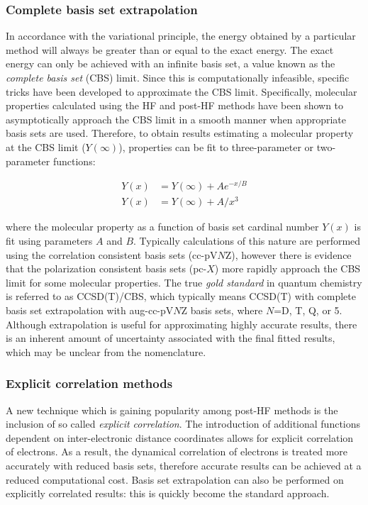 \subsubsection{Complete basis set extrapolation}

In accordance with the variational principle, the energy obtained by a particular method will always be greater than or equal to the exact energy. The exact energy can only be achieved with an infinite basis set, a value known as the \emph{complete basis set} (CBS) limit.\cite{Truhlar1998} Since this is computationally infeasible, specific tricks have been developed to approximate the CBS limit. Specifically, molecular properties calculated using the HF and post-HF methods have been shown to asymptotically approach the CBS limit in a smooth manner when appropriate basis sets are used. Therefore, to obtain results estimating a molecular property at the CBS limit ($Y(\infty)$), properties can be fit to three-parameter\cite{Feller1992,Feller1993} or two-parameter functions:\cite{Helgaker1997,Halkier1998}

\begin{align}
  Y(x) &= Y(\infty) + Ae^{-x/B} \\
  Y(x) &= Y(\infty) + A/x^3
\end{align}

\noindent where the molecular property as a function of basis set cardinal number $Y(x)$ is fit using parameters $A$ and $B$. Typically calculations of this nature are performed using the correlation consistent basis sets (cc-pV$N$Z), however there is evidence that the polarization consistent basis sets (pc-$X$) more rapidly approach the CBS limit for some molecular properties.\cite{Kupka2007} The true \emph{gold standard} in quantum chemistry is referred to as CCSD(T)/CBS, which typically means CCSD(T) with complete basis set extrapolation with aug-cc-pV$N$Z basis sets, where $N$=D, T, Q, or 5. Although extrapolation is useful for approximating highly accurate results, there is an inherent amount of uncertainty associated with the final fitted results, which may be unclear from the nomenclature.

\subsubsection{Explicit correlation methods}

A new technique which is gaining popularity among post-HF methods is the inclusion of so called \emph{explicit correlation}.\cite{Shiozaki2008,Kohn2008} The introduction of additional functions dependent on inter-electronic distance coordinates allows for explicit correlation of electrons.\cite{Tenno2012} As a result, the dynamical correlation of electrons is treated more accurately with reduced basis sets, therefore accurate results can be achieved at a reduced computational cost. Basis set extrapolation can also be performed on explicitly correlated results: this is quickly become the standard approach.\cite{Feller2013}


